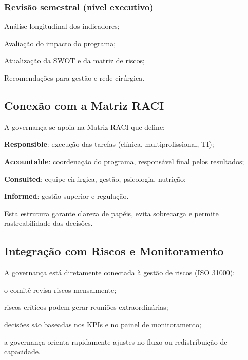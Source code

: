 \documentclass[12pt]{article}
\begin{document}
\subsubsection{Revisão semestral (nível executivo)}
\label{sec:org724ba9e}
\begin{hlevelthree}
\item Análise longitudinal dos indicadores;
\item Avaliação do impacto do programa;
\item Atualização da SWOT e da matriz de riscos;
\item Recomendações para gestão e rede cirúrgica.
\end{hlevelthree}

\subsection{Conexão com a Matriz RACI}
\label{sec:orgf4ac658}
A governança se apoia na Matriz RACI que define:
\begin{hleveltwo}
\item \textbf{Responsible}: execução das tarefas (clínica, multiprofissional, TI);
\item \textbf{Accountable}: coordenação do programa, responsável final pelos resultados;
\item \textbf{Consulted}: equipe cirúrgica, gestão, psicologia, nutrição;
\item \textbf{Informed}: gestão superior e regulação.
\end{hleveltwo}

Esta estrutura garante clareza de papéis, evita sobrecarga e permite rastreabilidade das decisões.

\subsection{Integração com Riscos e Monitoramento}
\label{sec:org4906663}
A governança está diretamente conectada à gestão de riscos (ISO 31000):
\begin{hleveltwo}
\item o comitê revisa riscos mensalmente;
\item riscos críticos podem gerar reuniões extraordinárias;
\item decisões são baseadas nos KPIs e no painel de monitoramento;
\item a governança orienta rapidamente ajustes no fluxo ou redistribuição de capacidade.
\end{hleveltwo}
\end{document}

